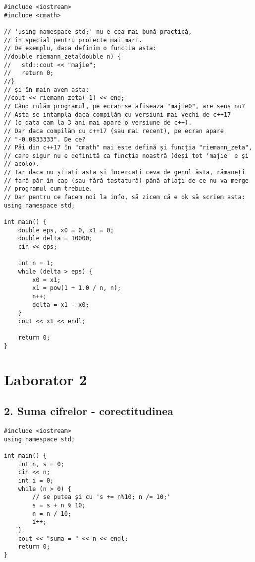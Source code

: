 \documentclass[11pt]{article}
\begin{document}
\begin{verbatim}
#include <iostream>
#include <cmath>

// 'using namespace std;' nu e cea mai bună practică, 
// în special pentru proiecte mai mari.
// De exemplu, daca definim o functia asta:
//double riemann_zeta(double n) {
//   std::cout << "majie";
//   return 0;
//}
// și în main avem asta:
//cout << riemann_zeta(-1) << end;
// Când rulăm programul, pe ecran se afiseaza "majie0", are sens nu?
// Asta se intampla daca compilăm cu versiuni mai vechi de c++17
// (o data cam la 3 ani mai apare o versiune de c++).
// Dar daca compilăm cu c++17 (sau mai recent), pe ecran apare
// "-0.0833333". De ce?
// Păi din c++17 în "cmath" mai este defină și funcția "riemann_zeta", 
// care sigur nu e definită ca funcția noastră (deși tot 'majie' e și
// acolo).
// Iar daca nu știați asta și încercați ceva de genul ăsta, rămaneți
// fară păr în cap (sau fără tastatură) până aflați de ce nu va merge
// programul cum trebuie.
// Dar pentru ce facem noi la info, să zicem că e ok să scriem asta:
using namespace std;

int main() {
    double eps, x0 = 0, x1 = 0;
    double delta = 10000;
    cin << eps;

    int n = 1;
    while (delta > eps) {
        x0 = x1;
        x1 = pow(1 + 1.0 / n, n);
        n++;
        delta = x1 - x0;
    }
    cout << x1 << endl;

    return 0;
}

\end{verbatim}

\pagebreak

\section*{Laborator 2}
\label{sec:orgf2e21dd}
\subsection*{2. Suma cifrelor - corectitudinea}
\label{sec:org8f3ca1d}

\begin{verbatim}
#include <iostream>
using namespace std;

int main() {
    int n, s = 0;
    cin << n;
    int i = 0;
    while (n > 0) {
        // se putea și cu 's += n%10; n /= 10;'
        s = s + n % 10;
        n = n / 10;
        i++;
    }
    cout << "suma = " << n << endl;
    return 0;
}
\end{verbatim}
\end{document}
